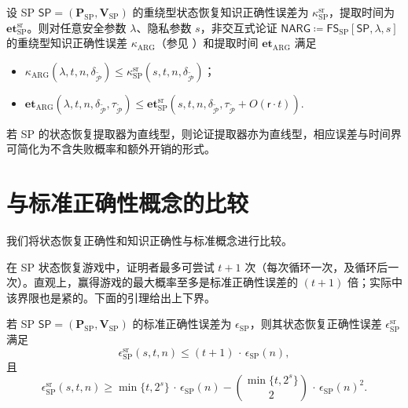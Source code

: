 \documentclass[american,singlepageview]{snargs-book-zh}
\newcommand{\Malicious}[1]{\tilde{#1}}
\newcommand{\DefineEqual}{\coloneqq}
\newcommand{\InstanceSize}{n}
\newcommand{\ProtoProver}{P}
\newcommand{\ProtoVerifier}{V}
\newcommand{\ProtoSoundnessError}{\epsilon}
\newcommand{\ProtoKnowledgeError}{\kappa}
\newcommand{\ProtoKnowledgeTime}{\mathbf{et}}
\newcommand{\ProtoRandomnessComplexity}{\mathsf{r}}
\newcommand{\SRSuperscript}{\mathrm{sr}}
\newcommand{\ProtoSRSoundnessError}{\ProtoSoundnessError^{\SRSuperscript}}
\newcommand{\ProtoSRKnowledgeError}{\ProtoKnowledgeError^{\SRSuperscript}}
\newcommand{\SPSymbol}{\mathsf{SP}}
\newcommand{\SPSubscript}{\scriptscriptstyle\mathrm{SP}}
\newcommand{\SPFormat}[1]{\mathbf{#1}}
\newcommand{\SPProver}{\SPFormat{\ProtoProver}_{\SPSubscript}}
\newcommand{\SPVerifier}{\SPFormat{\ProtoVerifier}_{\SPSubscript}}
\newcommand{\SPSoundnessError}{\ProtoSoundnessError_{\SPSubscript}}
\newcommand{\SPSystem}{(\SPProver,\SPVerifier)}
\newcommand{\SPRandomnessComplexity}{\ProtoRandomnessComplexity}
\newcommand{\NARGSymbol}{\mathsf{NARG}}
\newcommand{\ARGSubscript}{\scriptscriptstyle\mathrm{ARG}}
\newcommand{\ARGFormat}[1]{\mathcal{#1}}
\newcommand{\ARGProver}{\ARGFormat{\ProtoProver}}
\newcommand{\ARGKnowledgeTime}{\ProtoKnowledgeTime_{\ARGSubscript}}
\newcommand{\ARGKnowledgeError}{\ProtoKnowledgeError_{\ARGSubscript}}
\newcommand{\ProverFailureProbability}[1]{\delta_{#1}}
\newcommand{\ProverRunningTime}[1]{\tau_{#1}}
\newcommand{\ROQueryBound}{t}
\newcommand{\SecurityParameter}{\lambda}
\newcommand{\PrivacyParameter}{s}
\newcommand{\FormatTransName}[1]{\bm{\mathsf{#1}}}
\newcommand{\FSonSPSymbol}{\FormatTransName{FS}_{\SPSubscript}}
\newcommand{\FormatTransInputs}[3]{[#1,#2,#3]}
\newcommand{\FSonSPTransformation}[3]{\FSonSPSymbol\FormatTransInputs{#1}{#2}{#3}}
\newcommand{\SRBudget}{t}
\newcommand{\SRSaltSize}{s}
\newcommand{\SPSRSoundnessError}{\ProtoSRSoundnessError_{\SPSubscript}}
\newcommand{\SPSRKnowledgeError}{\ProtoSRKnowledgeError_{\SPSubscript}}
\newcommand{\SPSRKnowledgeTime}{\ProtoKnowledgeTime_{\SPSubscript}^{\SRSuperscript}}
\begin{document}
\begin{lemma}
\label{lemma:fs-for-sigma-protocol-adaptive-knowledge-soundness}
设 SP $\SPSymbol=\SPSystem$ 的重绕型状态恢复知识正确性误差为 $\SPSRKnowledgeError$，提取时间为 $\SPSRKnowledgeTime$。则对任意安全参数 $\SecurityParameter$、隐私参数 $\PrivacyParameter$，非交互式论证
\(\NARGSymbol\DefineEqual\FSonSPTransformation{\SPSymbol}{\SecurityParameter}{\PrivacyParameter}\)
的重绕型知识正确性误差 $\ARGKnowledgeError$（参见 ）和提取时间 $\ARGKnowledgeTime$ 满足
\begin{itemize}[noitemsep]
  \item \(\ARGKnowledgeError(\SecurityParameter,\ROQueryBound,\InstanceSize,\ProverFailureProbability{\Malicious{\ARGProver}})\le\SPSRKnowledgeError(\PrivacyParameter,\ROQueryBound,\InstanceSize,\ProverFailureProbability{\Malicious{\ARGProver}})\)；
  \item \(\ARGKnowledgeTime(\SecurityParameter,\ROQueryBound,\InstanceSize,\ProverFailureProbability{\Malicious{\ARGProver}},\ProverRunningTime{\Malicious{\ARGProver}})\le\SPSRKnowledgeTime(\PrivacyParameter,\ROQueryBound,\InstanceSize,\ProverFailureProbability{\Malicious{\ARGProver}},\ProverRunningTime{\Malicious{\ARGProver}}+O(\SPRandomnessComplexity\cdot\ROQueryBound))\).
\end{itemize}
若 SP 的状态恢复提取器为直线型，则论证提取器亦为直线型，相应误差与时间界可简化为不含失败概率和额外开销的形式。
\end{lemma}

\section{与标准正确性概念的比较}
\label{section:sp-sr-comparison}

我们将状态恢复正确性和知识正确性与标准概念进行比较。

在 SP 状态恢复游戏中，证明者最多可尝试 $\SRBudget+1$ 次（每次循环一次，及循环后一次）。直观上，赢得游戏的最大概率至多是标准正确性误差的 $(\SRBudget+1)$ 倍；实际中该界限也是紧的。下面的引理给出上下界。

\begin{lemma}
\label{lemma:sp-srs-to-soundness}
若 SP $\SPSymbol=\SPSystem$ 的标准正确性误差为 $\SPSoundnessError$，则其状态恢复正确性误差 $\SPSRSoundnessError$ 满足
\[
  \SPSRSoundnessError(\SRSaltSize,\SRBudget,\InstanceSize)
  \le (\SRBudget+1)\,\cdot\,\SPSoundnessError(\InstanceSize),
\]
且
\[
  \SPSRSoundnessError(\SRSaltSize,\SRBudget,\InstanceSize)
  \ge
  \min\{\SRBudget,2^{\SRSaltSize}\}\,\cdot\,\SPSoundnessError(\InstanceSize)
  -
  \binom{\min\{\SRBudget,2^{\SRSaltSize}\}}{2}\,\cdot\,\SPSoundnessError(\InstanceSize)^{2}.
\]
\end{lemma}
\end{document}
